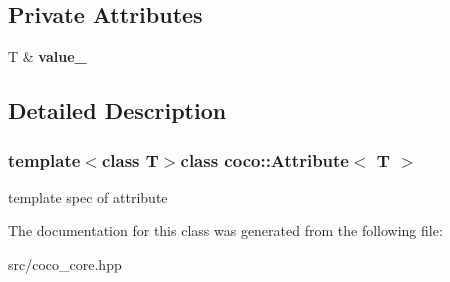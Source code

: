 \subsection*{Private Attributes}
\begin{DoxyCompactItemize}
\item 
\hypertarget{classcoco_1_1_attribute_abb200730d0b02d75077c5e4875af6482}{}T \& {\bfseries value\+\_\+}\label{classcoco_1_1_attribute_abb200730d0b02d75077c5e4875af6482}

\end{DoxyCompactItemize}


\subsection{Detailed Description}
\subsubsection*{template$<$class T$>$class coco\+::\+Attribute$<$ T $>$}

template spec of attribute 

The documentation for this class was generated from the following file\+:\begin{DoxyCompactItemize}
\item 
src/coco\+\_\+core.\+hpp\end{DoxyCompactItemize}
